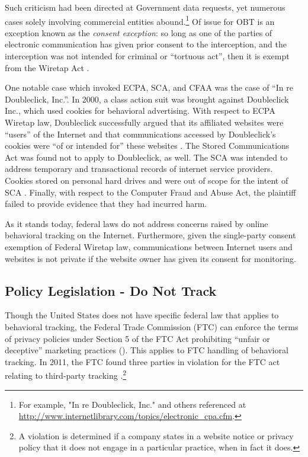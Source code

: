 Such criticism had been directed at Government data requests, yet numerous cases solely involving commercial entities  abound.\footnote{For example, "In re Doubleclick, Inc." and others referenced at \url{http://www.internetlibrary.com/topics/electronic_cpa.cfm}.}  Of issue for OBT is an exception known as the \emph{consent exception}: so long as one of the parties of electronic communication has given prior consent to the interception, and the interception was not intended for criminal or ``tortuous act'', then it is exempt from the Wiretap Act  \citep{Anonymous:2008vj}.  

One notable case which invoked ECPA, SCA, and CFAA was the case of ``In re Doubleclick, Inc.''. In 2000, a class action suit was brought against Doubleclick Inc., which used cookies for behavioral advertising. With respect to ECPA Wiretap law, Doubleclick successfully argued that its affiliated websites were ``users'' of the Internet and that communications accessed by Doubleclick's cookies were ``of or intended for'' these websites  \citep{Anonymous:Hkl3lUXG}.  The Stored Communications Act was found not to apply to Doubleclick, as well. The SCA was intended to address temporary and transactional records of internet service providers. Cookies stored on personal hard drives and were out of scope for the intent of SCA  \citep{Anonymous:Hkl3lUXG}.  Finally, with respect to the Computer Fraud and Abuse Act, the plaintiff failed to provide evidence that they had incurred harm.

As it stands today, federal laws do not address concerns raised by online behavioral tracking on the Internet. Furthermore, given the single-party consent exemption of Federal Wiretap law, communications between Internet users and websites is not private if the website owner has given its consent for monitoring.

\subsection{Policy Legislation - Do Not Track}
\label{policylegislation-donottrack}

Though the United States does not have specific federal law that applies to behavioral tracking, the Federal Trade Commission (FTC) can enforce the terms of privacy policies under Section 5 of the FTC Act prohibiting ``unfair or deceptive'' marketing practices  (\citeauthor{Anonymous:vq}).  This applies to FTC handling of behavioral tracking. In 2011, the FTC found three parties in violation for the FTC act relating to third-party tracking  \citep{Mayer:2012wt}.\footnote{A violation is determined if a company states in a website notice or privacy policy that it does not engage in a particular practice, when in fact it does.} 

